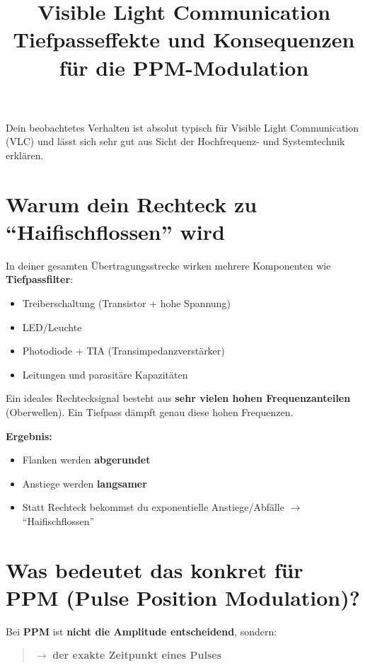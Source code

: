 \documentclass[a4paper,12pt]{article}
\title{Visible Light Communication\\[0.4em]
  \large Tiefpasseffekte und Konsequenzen für die PPM-Modulation}
\author{}
\date{}
\begin{document}
\maketitle

Dein beobachtetes Verhalten ist absolut typisch für Visible Light Communication (VLC)
und lässt sich sehr gut aus Sicht der Hochfrequenz- und Systemtechnik erklären.

\section*{Warum dein Rechteck zu \enquote{Haifischflossen} wird}

In deiner gesamten Übertragungsstrecke wirken mehrere Komponenten wie \textbf{Tiefpassfilter}:

\begin{itemize}
  \item Treiberschaltung (Transistor + hohe Spannung)
  \item LED/Leuchte
  \item Photodiode + TIA (Transimpedanzverstärker)
  \item Leitungen und parasitäre Kapazitäten
\end{itemize}

Ein ideales Rechtecksignal besteht aus \textbf{sehr vielen hohen Frequenzanteilen} (Oberwellen).
Ein Tiefpass dämpft genau diese hohen Frequenzen.

\textbf{Ergebnis:}
\begin{itemize}
  \item Flanken werden \textbf{abgerundet}
  \item Anstiege werden \textbf{langsamer}
  \item Statt Rechteck bekommst du exponentielle Anstiege/Abfälle
        $\rightarrow$ \enquote{Haifischflossen}
\end{itemize}

\section*{Was bedeutet das konkret für PPM (Pulse Position Modulation)?}

Bei \textbf{PPM} ist \textbf{nicht die Amplitude entscheidend}, sondern:

\begin{quote}
  $\rightarrow$ \textbf{der exakte Zeitpunkt eines Pulses}
\end{quote}
\end{document}
